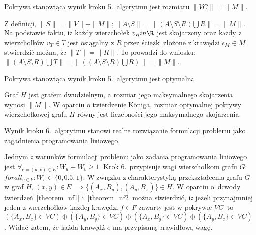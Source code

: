 \begin{theorem}
  Pokrywa stanowiąca wynik kroku 5.\ algorytmu jest rozmiaru $\|VC\| = \|M\|$. 
\end{theorem}
\begin{bproof}
  Z definicji, $\|S\| = \|V\| - \|M\|; \|A \setminus S\|=\|(A \setminus S
  \setminus R) \bigcup R\|=\|M\|$.\\
  Na podstawie faktu, iż każdy wierzchołek $v_R in \R$ jest skojarzony oraz
  każdy z wierzchołków $v_T \in T$ jest osiągalny z $R$ przez ścieżki złożone z
  krawędzi $e_M \in M$ stwierdzić można, że $\|T\|=\|R\|$.
  To prowadzi do wniosku: $\|(A\setminus S\setminus R)\bigcup T\|=\|((A \setminus
  S \setminus R) \bigcup R)\|=\|M\|$.
\end{bproof}
\begin{theorem}\label{theorem_nf2}
  Pokrywa stanowiąca wynik kroku 5.\ algorytmu jest optymalna.
\end{theorem}
\begin{bproof}
  Graf $H$ jest grafem dwudzielnym, a rozmiar jego maksymalnego skojarzenia
  wynosi $\|M\|$.
  W oparciu o twierdzenie K\"oniga, rozmiar optymalnej pokrywy wierzchołkowej
  grafu $H$ równy jest liczebności jego maksymalnego skojarzenia.
\end{bproof}
\begin{theorem}
  Wynik kroku 6.~algorytmu stanowi realne rozwiązanie formulacji problemu jako
  zagadnienia programowania liniowego.
\end{theorem}
\begin{bproof}
  Jednym z warunków formulacji problemu jako zadania programowania liniowego jest
  $\forall_{e=(u,v) \in E}: W_u + W_v \geq 1$.
  Krok 6.\ przypisuje wagi wierzchołkom grafu $G$: ${forall_{v \in V}: W_v \in
  \{0, 0.5, 1\}}$.
  W związku z charakterystyką przekształcenia grafu $G$ w graf $H$, 
  $(x,y) \in E \implies \{(A_x, B_y), (A_y, B_x)\} \in H$.
  W oparciu o~dowody twierdzeń~\ref{theorem_nf1} i~\ref{theorem_nf2} można
  stwierdzić, iż jeżeli przynajmniej jeden z wierzchołków każdej krawędzi $f \in
  F$ zawarty jest w pokrywie $VC$, to $(\{A_x, B_x\} \in VC) \oplus (\{A_y,
  B_y\} \in VC) \oplus (\{A_x, B_y\} \in VC) \oplus (\{A_y, B_x\} \in VC)$.
  Widać zatem, że każda krawędź $e$ ma przypisaną prawidłową wagę.
\end{bproof}
